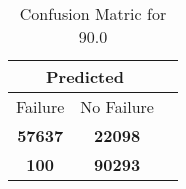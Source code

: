 \begin{table}[] 
\caption{Confusion Matric for 90.0} 
\label{Table: Prediction Accuracy-DMD90.0OnlySunEKF-ignoreReflectionEKF-top2-Reflection} 
\centering 
\begin{tabular} 
 {@{}ccc@{}} 
\toprule 
\multicolumn{2}{c}{\textbf{Predicted}}
 \\ \midrule 
\multicolumn{1}{|c|}{Failure} & 
\multicolumn{1}{c|}{No Failure}
 \\ \midrule 
\multicolumn{1}{|c|}{\color{green}\textbf{57637}} & 
\multicolumn{1}{c|}{\color{red}\textbf{22098}}
 \\ \midrule 
\multicolumn{1}{|c|}{\color{red}\textbf{100}} & 
\multicolumn{1}{c|}{\color{green}\textbf{90293}}
 \\ \bottomrule 
\end{tabular} 
\end{table} 
